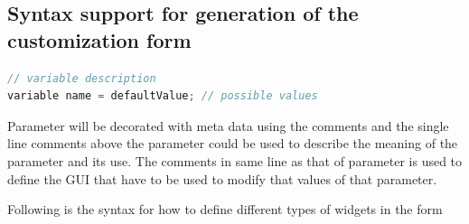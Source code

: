 \documentclass[12pt]{report}
\begin{document}
\subsection{Syntax support for generation of the customization form}

\begin{lstlisting}[language=c++]
// variable description
variable name = defaultValue; // possible values
\end{lstlisting}

Parameter will be decorated with meta data using the comments and the single line comments above the parameter could be used to describe the meaning of the parameter and its use. The comments in same line as that of parameter is used to define the GUI that have to be used to modify that values of that parameter.

Following is the syntax for how to define different types of widgets in the form
\end{document}
